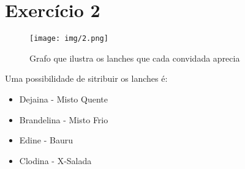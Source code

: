 \section{Exercício 2} 

\begin{figure}[h!]
	\caption{Grafo que ilustra os lanches que cada convidada aprecia}
	\texttt{[image: img/2.png]}
\end{figure}

Uma possibilidade de sitribuir os lanches é:

\begin{itemize}
	\item Dejaina - Misto Quente
	\item Brandelina - Misto Frio
	\item Edine - Bauru
	\item Clodina - X-Salada
\end{itemize}
